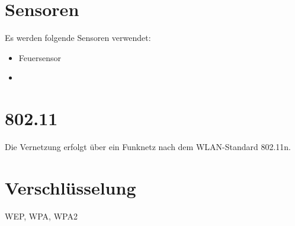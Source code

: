 \section{Sensoren}

Es werden folgende Sensoren verwendet:

\begin{itemize}
\item Feuersensor
\item
\end{itemize}

\section{802.11}

Die Vernetzung erfolgt über ein Funknetz nach dem WLAN-Standard 802.11n. 

\section{Verschlüsselung}
WEP, WPA, WPA2



